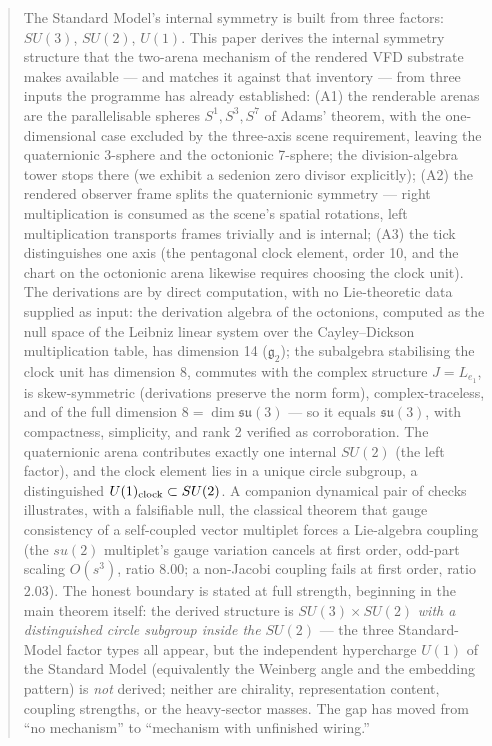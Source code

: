 \documentclass[12pt]{article}
\theoremstyle{definition}
\theoremstyle{remark}
\begin{document}
\begin{abstract}
The Standard Model's internal symmetry is built from three factors: $SU(3)$, $SU(2)$, $U(1)$. This paper derives the internal symmetry structure that the two-arena mechanism of the rendered VFD substrate makes available --- and matches it against that inventory --- from three inputs the programme has already established: (A1) the renderable arenas are the parallelisable spheres $S^1, S^3, S^7$ of Adams' theorem, with the one-dimensional case excluded by the three-axis scene requirement, leaving the quaternionic 3-sphere and the octonionic 7-sphere; the division-algebra tower stops there (we exhibit a sedenion zero divisor explicitly); (A2) the rendered observer frame splits the quaternionic symmetry --- right multiplication is consumed as the scene's spatial rotations, left multiplication transports frames trivially and is internal; (A3) the tick distinguishes one axis (the pentagonal clock element, order 10, and the chart on the octonionic arena likewise requires choosing the clock unit). The derivations are by direct computation, with no Lie-theoretic data supplied as input: the derivation algebra of the octonions, computed as the null space of the Leibniz linear system over the Cayley--Dickson multiplication table, has dimension 14 ($\mathfrak g_2$); the subalgebra stabilising the clock unit has dimension 8, commutes with the complex structure $J = L_{e_1}$, is skew-symmetric (derivations preserve the norm form), complex-traceless, and of the full dimension $8 = \dim\mathfrak{su}(3)$ --- so it equals $\mathfrak{su}(3)$, with compactness, simplicity, and rank 2 verified as corroboration. The quaternionic arena contributes exactly one internal $SU(2)$ (the left factor), and the clock element lies in a unique circle subgroup, a distinguished $U(1)_{\rm clock} \subset SU(2)$. A companion dynamical pair of checks illustrates, with a falsifiable null, the classical theorem that gauge consistency of a self-coupled vector multiplet forces a Lie-algebra coupling (the $su(2)$ multiplet's gauge variation cancels at first order, odd-part scaling $O(s^3)$, ratio $8.00$; a non-Jacobi coupling fails at first order, ratio $2.03$). The honest boundary is stated at full strength, beginning in the main theorem itself: the derived structure is $SU(3)\times SU(2)$ \emph{with a distinguished circle subgroup inside the} $SU(2)$ --- the three Standard-Model factor types all appear, but the independent hypercharge $U(1)$ of the Standard Model (equivalently the Weinberg angle and the embedding pattern) is \emph{not} derived; neither are chirality, representation content, coupling strengths, or the heavy-sector masses. The gap has moved from ``no mechanism'' to ``mechanism with unfinished wiring.''
\end{abstract}
\end{document}
